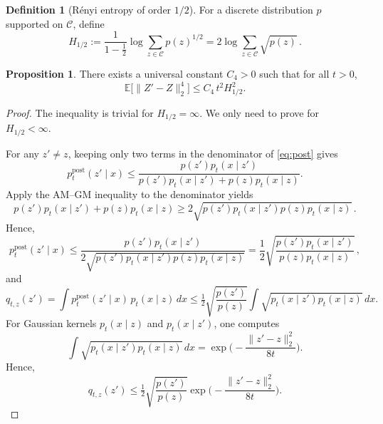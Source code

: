 \documentclass[11pt]{article}
\theoremstyle{definition}
\newtheorem{proposition}{Proposition}
\newtheorem{definition}{Definition}
\numberwithin{equation}{section}
\begin{document}
\begin{definition}[R\'enyi entropy of order $1/2$]\label{def:renyi}
For a discrete distribution $p$ supported on $\mathcal C$, define
\[
H_{1/2}
:= \frac{1}{1-\tfrac12}\log\sum_{z\in\mathcal C}p(z)^{1/2}
= 2\log\sum_{z\in\mathcal C}\sqrt{p(z)}\,.
\]
\end{definition}

\begin{proposition}\label{thm:4th-moment-renyi}
There exists a universal constant $C_4>0$ such that for all $t>0$,
\begin{equation}\label{eq:4th-moment-renyi}
\mathbb E\big[\|Z'-Z\|_2^4\big]
\le C_4\,t^2 H_{1/2}^2.
\end{equation}
\end{proposition}

\begin{proof}
The inequality is trivial for $H_{1/2}=\infty$. We only need to prove for $H_{1/2}<\infty$.


For any $z'\neq z$, keeping only two terms in the denominator of \eqref{eq:post} gives
\[
p^{\mathrm{post}}_{t}(z'\mid x)\le \frac{p(z')p_{t}(x\mid z')}{p(z')p_{t}(x\mid z')+p(z)p_{t}(x\mid z)}.
\]
Apply the AM–GM inequality to the denominator yields
\[
p(z')p_{t}(x\mid z')+p(z)p_{t}(x\mid z)\ge 2\sqrt{p(z')p_{t}(x\mid z')p(z)p_{t}(x\mid z)}\,.
\]
Hence,
\[
p^{\mathrm{post}}_{t}(z'\mid x)\le \frac{p(z')p_{t}(x\mid z')}{2\sqrt{p(z')p_{t}(x\mid z')p(z)p_{t}(x\mid z)}}
= \frac{1}{2}\sqrt{\frac{p(z')p_{t}(x\mid z')}{p(z)p_{t}(x\mid z)}}\,,
\]
and
\[
q_{t,z}(z')=\int p^{\mathrm{post}}_{t}(z'\mid x)\,p_{t}(x\mid z)\,dx
\le \tfrac12\sqrt{\frac{p(z')}{p(z)}}
\int \sqrt{p_{t}(x\mid z')p_{t}(x\mid z)}\,dx.
\]
For Gaussian kernels \(p_{t}(x\mid z)\) and \( p_{t}(x\mid z')\), one computes
\[
\int \sqrt{p_{t}(x\mid z')p_{t}(x\mid z)}\,dx
= \exp\Big(-\frac{\|z'-z\|_2^2}{8t}\Big).
\]
Hence,
\begin{equation*}\label{eq:q-basic}
q_{t,z}(z')\le \tfrac12\sqrt{\frac{p(z')}{p(z)}}
\exp\Big(-\frac{\|z'-z\|_2^2}{8t}\Big).
\end{equation*}


\end{proof}
\end{document}
